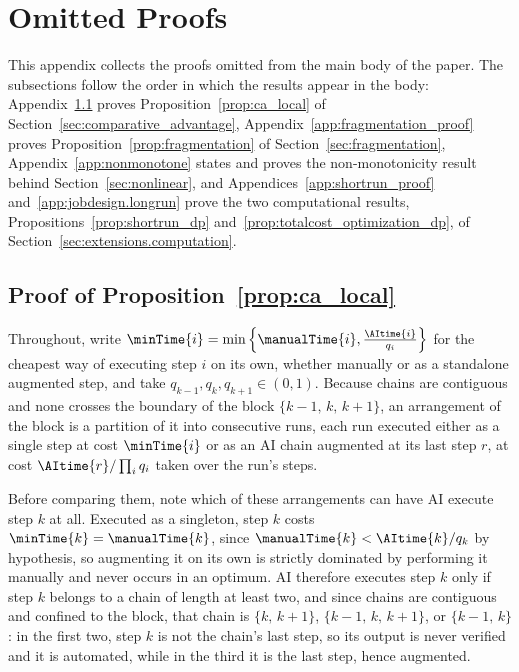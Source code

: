 \section{Omitted Proofs}
\label{app:omitted_proofs}

This appendix collects the proofs omitted from the main body of the paper.
The subsections follow the order in which the results appear in the body: Appendix~\ref{app:ca_local_proof} proves Proposition~\ref{prop:ca_local} of Section~\ref{sec:comparative_advantage}, Appendix~\ref{app:fragmentation_proof} proves Proposition~\ref{prop:fragmentation} of Section~\ref{sec:fragmentation}, Appendix~\ref{app:nonmonotone} states and proves the non-monotonicity result behind Section~\ref{sec:nonlinear}, and Appendices~\ref{app:shortrun_proof} and~\ref{app:jobdesign.longrun} prove the two computational results, Propositions~\ref{prop:shortrun_dp} and~\ref{prop:totalcost_optimization_dp}, of Section~\ref{sec:extensions.computation}.

\subsection{Proof of Proposition~\ref{prop:ca_local}}
\label{app:ca_local_proof}

Throughout, write $\minTime{i} = \min\left\{\manualTime{i}, \frac{\AItime{i}}{q_i}\right\}$ for the cheapest way of executing step $i$ on its own, whether manually or as a standalone augmented step, and take $q_{k-1}, q_k, q_{k+1} \in (0,1)$.
Because chains are contiguous and none crosses the boundary of the block $\{k-1,\, k,\, k+1\}$, an arrangement of the block is a partition of it into consecutive runs, each run executed either as a single step at cost $\minTime{i}$ or as an AI chain augmented at its last step $r$, at cost $\AItime{r}/\prod_i q_i$ taken over the run's steps.

Before comparing them, note which of these arrangements can have AI execute step $k$ at all.
Executed as a singleton, step $k$ costs $\minTime{k} = \manualTime{k}$, since $\manualTime{k} < \AItime{k}/q_k$ by hypothesis, so augmenting it on its own is strictly dominated by performing it manually and never occurs in an optimum.
AI therefore executes step $k$ only if step $k$ belongs to a chain of length at least two, and since chains are contiguous and confined to the block, that chain is $\{k,\, k+1\}$, $\{k-1,\, k,\, k+1\}$, or $\{k-1,\, k\}$: in the first two, step $k$ is not the chain's last step, so its output is never verified and it is automated, while in the third it is the last step, hence augmented.

